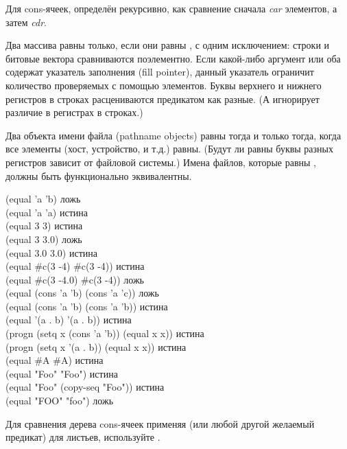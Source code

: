 \begin{defun}[Функция]
\begin{defun}[Функция]
Для cons-ячеек,  определён рекурсивно, как сравнение 
сначала \emph{car} элементов, а затем \emph{cdr}.

Два массива равны  только, если они равны , с одним
исключением:
строки и битовые вектора сравниваются поэлементно.
Если какой-либо аргумент или оба содержат указатель заполнения (fill pointer),
данный указатель ограничит количество проверяемых с помощью 
элементов.
Буквы верхнего и нижнего регистров в строках расцениваются предикатом 
как разные. (А  игнорирует различие в регистрах в строках.) 

Два объекта имени файла (pathname objects) равны  тогда и только
тогда, когда все элементы (хост, устройство, и т.д.) равны. (Будут ли равны
буквы разных регистров зависит от файловой системы.) Имена файлов, которые равны
, должны быть функционально эквивалентны.

\begin{lisp}
(equal 'a 'b) \textrm{ложь} \\
(equal 'a 'a) \textrm{истина} \\
(equal 3 3) \textrm{истина} \\
(equal 3 3.0) \textrm{ложь} \\
(equal 3.0 3.0) \textrm{истина} \\
(equal \#c(3 -4) \#c(3 -4)) \textrm{истина} \\
(equal \#c(3 -4.0) \#c(3 -4)) \textrm{ложь} \\
(equal (cons 'a 'b) (cons 'a 'c)) \textrm{ложь} \\
(equal (cons 'a 'b) (cons 'a 'b)) \textrm{истина} \\
(equal '(a . b) '(a . b)) \textrm{истина} \\
(progn (setq x (cons 'a 'b)) (equal x x)) \textrm{истина} \\
(progn (setq x '(a . b)) (equal x x)) \textrm{истина} \\
(equal \#{\Xbackslash}A \#{\Xbackslash}A) \textrm{истина} \\
(equal "Foo" "Foo") \textrm{истина} \\
(equal "Foo" (copy-seq "Foo")) \textrm{истина} \\
(equal "FOO" "foo") \textrm{ложь}
\end{lisp}
Для сравнения дерева cons-ячеек применяя  (или любой другой желаемый
предикат) для листьев, используйте .

\end{defun}


\end{defun}
